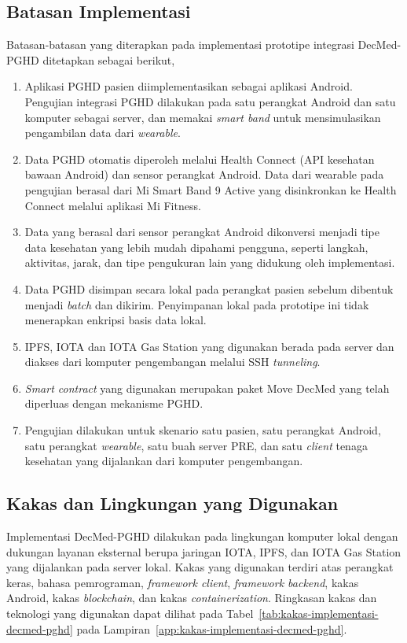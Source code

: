 \subsection{Batasan Implementasi}

Batasan-batasan yang diterapkan pada implementasi prototipe integrasi DecMed-PGHD ditetapkan sebagai berikut,

\begin{enumerate}
    \item Aplikasi PGHD pasien diimplementasikan sebagai aplikasi Android.
    Pengujian integrasi PGHD dilakukan pada satu perangkat Android dan satu komputer sebagai server, dan memakai \textit{smart band} untuk mensimulasikan pengambilan data dari \textit{wearable}.
    \item Data PGHD otomatis diperoleh melalui Health Connect (API kesehatan bawaan Android) dan sensor perangkat Android.
    Data dari wearable pada pengujian berasal dari Mi Smart Band 9 Active yang disinkronkan ke Health Connect melalui aplikasi Mi Fitness.
    \item Data yang berasal dari sensor perangkat Android dikonversi menjadi tipe data kesehatan yang lebih mudah dipahami pengguna, seperti langkah, aktivitas, jarak, dan tipe pengukuran lain yang didukung oleh implementasi.
    \item Data PGHD disimpan secara lokal pada perangkat pasien sebelum dibentuk menjadi \textit{batch} dan dikirim.
    Penyimpanan lokal pada prototipe ini tidak menerapkan enkripsi basis data lokal.
    \item IPFS, IOTA dan IOTA Gas Station yang digunakan berada pada server dan diakses dari komputer pengembangan melalui SSH \textit{tunneling}.
    \item \textit{Smart contract} yang digunakan merupakan paket Move DecMed yang telah diperluas dengan mekanisme PGHD\@.
    \item Pengujian dilakukan untuk skenario satu pasien, satu perangkat Android, satu perangkat \textit{wearable}, satu buah server PRE, dan satu \textit{client} tenaga kesehatan yang dijalankan dari komputer pengembangan.
\end{enumerate}

\subsection{Kakas dan Lingkungan yang Digunakan}

Implementasi DecMed-PGHD dilakukan pada lingkungan komputer lokal dengan dukungan layanan eksternal berupa jaringan IOTA, IPFS, dan IOTA Gas Station yang dijalankan pada server lokal.
Kakas yang digunakan terdiri atas perangkat keras, bahasa pemrograman, \textit{framework client}, \textit{framework backend}, kakas Android, kakas \textit{blockchain}, dan kakas \textit{containerization}.
Ringkasan kakas dan teknologi yang digunakan dapat dilihat pada Tabel~\ref{tab:kakas-implementasi-decmed-pghd} pada Lampiran~\ref{app:kakas-implementasi-decmed-pghd}.

